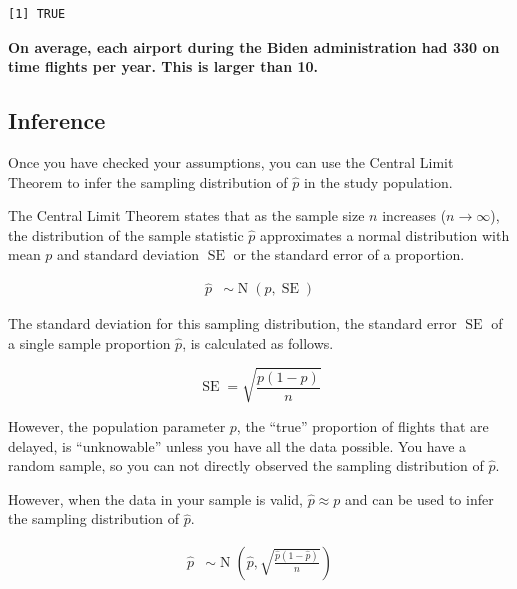 \documentclass[
  letterpaper,
  DIV=11,
  numbers=noendperiod]{scrartcl}
\begin{document}
\begin{verbatim}
[1] TRUE
\end{verbatim}

\begin{tcolorbox}[enhanced jigsaw, colback=white, breakable, arc=.35mm, left=2mm, colframe=quarto-callout-warning-color-frame, opacityback=0, rightrule=.15mm, toprule=.15mm, bottomrule=.15mm, leftrule=.75mm]

\textbf{On average, each airport during the Biden administration had 330
on time flights per year. This is larger than 10.}

\end{tcolorbox}

\subsection{Inference}\label{inference}

Once you have checked your assumptions, you can use the Central Limit
Theorem to infer the sampling distribution of \(\hat{p}\) in the study
population.

The Central Limit Theorem states that as the sample size \(n\) increases
(\(n \to \infty\)), the distribution of the sample statistic \(\hat{p}\)
approximates a normal distribution with mean \(p\) and standard
deviation \(\operatorname{SE}\) or the standard error of a proportion.

\[
\begin{aligned}
\hat{p} &\sim \operatorname{N}\left(p, \operatorname{SE}\right)
\end{aligned}
\]

The standard deviation for this sampling distribution, the standard
error \(\operatorname{SE}\) of a single sample proportion \(\hat{p}\),
is calculated as follows.

\[
\operatorname{SE}=\sqrt{\frac{p(1-p)}{n}}
\]

However, the population parameter \(p\), the ``true'' proportion of
flights that are delayed, is ``unknowable'' unless you have all the data
possible. You have a random sample, so you can not directly observed the
sampling distribution of \(\hat{p}\).

However, when the data in your sample is valid, \(\hat{p} \approx p\)
and can be used to infer the sampling distribution of \(\hat{p}\).

\[
\begin{aligned}
\hat{p} &\sim \operatorname{N}\left(\hat{p}, \sqrt{\frac{\hat{p}(1-\hat{p})}{n}}\right)
\end{aligned}
\]
\end{document}
